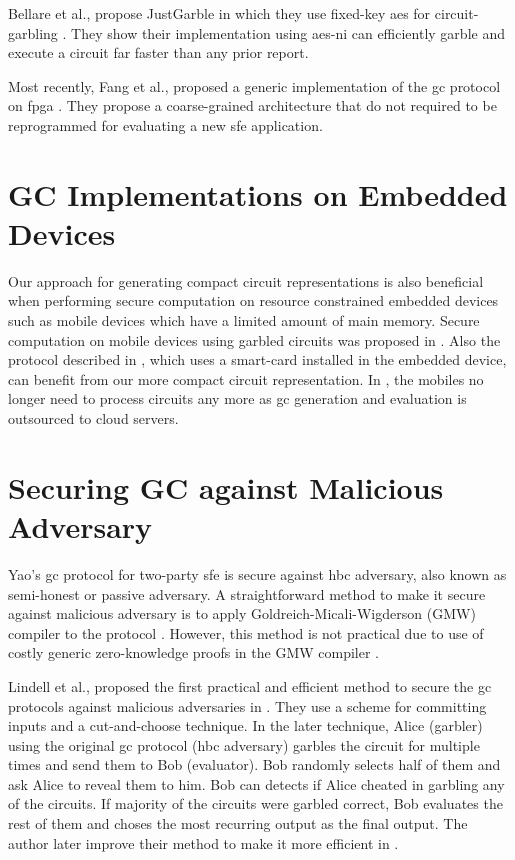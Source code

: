 Bellare et al., propose JustGarble in which they use fixed-key \acrshort{aes} for circuit-garbling \cite{bellare2013efficient}.
They show their implementation using \acrshort{aes-ni} can efficiently garble and execute a circuit far faster than any prior report.

Most recently, Fang et al., proposed a generic implementation of the \acrshort{gc} protocol on \acrshort{fpga} \cite{fang2017secure}.
They propose a coarse-grained architecture that do not required to be reprogrammed for evaluating a new \acrshort{sfe} application.

\section{GC Implementations on Embedded Devices} \label{sec:related-embedded}
Our approach for generating compact circuit representations is also beneficial when performing secure computation on resource constrained embedded devices such as mobile devices which have a limited amount of main memory.
Secure computation on mobile devices using garbled circuits was proposed in \cite{huang2011privacy}.
Also the protocol described in \cite{demmler2014ad}, which uses a smart-card installed in the embedded device, can benefit from our more compact circuit representation.
In \cite{carter2016secure, carter2014whitewash}, the mobiles no longer need to process circuits any more as \acrshort{gc} generation and evaluation is outsourced to cloud servers.

\section{Securing GC against Malicious Adversary}\label{sec:related-malicious}
Yao's \acrshort{gc} protocol for two-party \acrshort{sfe} is secure against \acrshort{hbc} adversary, also known as semi-honest or passive adversary.
A straightforward method to make it secure against malicious adversary is to apply Goldreich-Micali-Wigderson (GMW) compiler to the protocol \cite{goldreich1987play}.
However, this method is not practical due to use of costly generic zero-knowledge proofs in the GMW compiler \cite{lindell2007efficient}.

Lindell et al., proposed the first practical and efficient method to secure the \acrshort{gc} protocols against malicious adversaries in \cite{lindell2007efficient}.
They use a scheme for committing inputs and a cut-and-choose technique.
In the later technique, Alice (garbler) using the original \acrshort{gc} protocol (\acrshort{hbc} adversary) garbles the circuit for multiple times and send them to Bob (evaluator).
Bob randomly selects half of them and ask Alice to reveal them to him.
Bob can detects if Alice cheated in garbling any of the circuits.
If majority of the circuits were garbled correct, Bob evaluates the rest of them and choses the most recurring output as the final output.
The author later improve their method to make it more efficient in \cite{lindell2012secure}.


